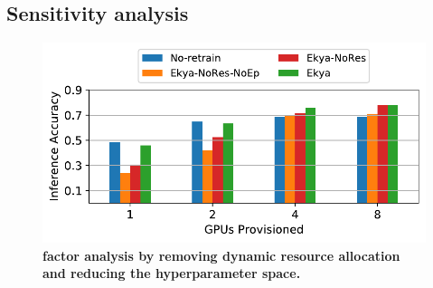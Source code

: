 


\subsection{Sensitivity analysis}
\label{subsec:sensitivity-eval}


\begin{figure} [t!]
 	\includegraphics[width=\linewidth]{results/ablation_cityscapes_golden.pdf}
	\caption{\small \bf {\name} factor analysis by removing  dynamic resource allocation and reducing the hyperparameter space.}
	\label{fig:factor-analysis}
\end{figure}

